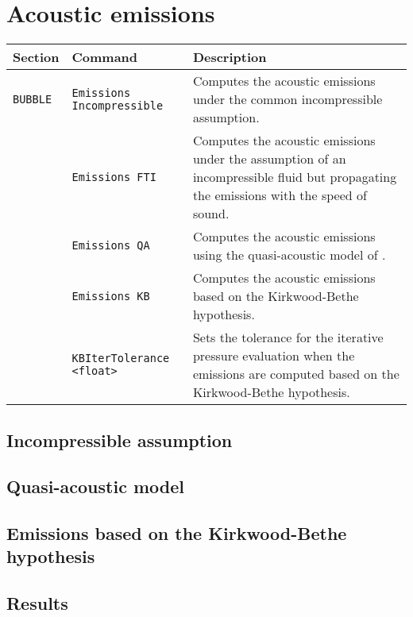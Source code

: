 \chapter{Acoustic emissions}

\vspace{0.8em}

\noindent
\begin{tabular}{p{} p{} p{}}
    \textbf{Section} &\textbf{Command} & \textbf{Description} 
\vspace{1mm} \\ \hline
{\tt BUBBLE} & {\tt Emissions Incompressible} & Computes the acoustic emissions under the common incompressible assumption.\\ 
& {\tt Emissions FTI} & Computes the acoustic emissions under the assumption of an incompressible fluid but propagating the emissions with the speed of sound.\\ 
& {\tt Emissions QA} & Computes the acoustic emissions using the quasi-acoustic model of \citet{Gilmore1952}.\\ 
& {\tt Emissions KB} & Computes the acoustic emissions based on the Kirkwood-Bethe hypothesis.\\ 
 & {\tt KBIterTolerance <float>} & Sets the tolerance for the iterative pressure evaluation when the emissions are computed based on the Kirkwood-Bethe hypothesis.\\ 
 \hline
\end{tabular} \vspace{1em}

\section{Incompressible assumption}

\section{Quasi-acoustic model}

\section{Emissions based on the Kirkwood-Bethe hypothesis}
\label{sec:emissionskb}

\section{Results}